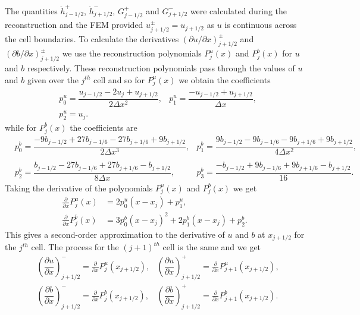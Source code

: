\documentclass[times]{elsarticle}
\begin{document}
The quantities $\ddot{h}^+_{j - 1/2}$, $\ddot{h}^-_{j + 1/2}$, $G^+_{j - 1/2}$ and $G^-_{j + 1/2}$ were calculated during the reconstruction and the FEM provided $u^\pm_{j+1/2} = u_{j+1/2}$ as $u$ is continuous across the cell boundaries. To calculate the derivatives $ \left({\partial {u}}/{\partial x} \right)^\pm_{j + 1/2}$ and $ \left({\partial {b}}/{\partial x} \right)^\pm_{j + 1/2}$ we use the reconstruction polynomials $P^u_j(x)$ and $P^b_j(x)$ for $u$ and $b$ respectively. These reconstruction polynomials pass through the values of $u$ and $b$ given over the $j^{th}$ cell and so
for $P^u_j(x)$ we obtain the coefficients
\begin{align*}
&p^u_0 =  \dfrac{u_{j-1/2} - 2u_j + u_{j+1/2}}{2 \Delta x^2}, 
&p^u_1 =  \dfrac{-u_{j-1/2} + u_{j+1/2}}{\Delta x},\\
&p^u_2 =  u_j.
\end{align*}
while for $P^b_j(x)$ the coefficients are
\begin{align*}
&p^b_0 =  \dfrac{-9b_{j-1/2} + 27b_{j-1/6} - 27 b_{j+1/6} + 9b_{j+1/2}}{2 \Delta x^3}, 
&p^b_1 =  \dfrac{9b_{j-1/2} - 9b_{j-1/6} - 9b_{j+1/6} + 9b_{j+1/2}}{4 \Delta x^2},\\ \\ 
&p^b_2 =  \dfrac{b_{j-1/2} - 27b_{j-1/6} + 27 b_{j+1/6} - b_{j+1/2}}{8 \Delta x},
&p^b_3 =  \dfrac{-b_{j-1/2}  + 9b_{j-1/6} + 9 b_{j+1/6} - b_{j+1/2}}{16}.
\end{align*}
Taking the derivative of the polynomials $P^u_j(x)$ and $P^b_j(x)$ we get
\begin{align*}
\frac{\partial }{\partial x}P^u_j(x) &= 2p^u_0 \left(x - x_j\right) + p^u_1, \\
\frac{\partial }{\partial x}P^b_j(x) &= 3p^b_0 \left(x - x_j\right)^2 + 2p^b_1 \left(x - x_j\right) + p^b_2.
\end{align*}
This gives a second-order approximation to the derivative of $u$ and $b$ at $x_{j+1/2}$ for the $j^{th}$ cell. The process for the $(j+1)^{th}$ cell is the same and we get 
\begin{align}
&\left(\dfrac{\partial {u}}{\partial x} \right)^-_{j + 1/2} = \frac{\partial }{\partial x}P^u_j(x_{j+1/2}), 
&\left(\dfrac{\partial {u}}{\partial x} \right)^+_{j + 1/2} = \frac{\partial }{\partial x}P^u_{j+1}(x_{j+1/2}),  \\
&\left(\dfrac{\partial {b}}{\partial x} \right)^-_{j + 1/2} = \frac{\partial }{\partial x}P^b_j(x_{j+1/2}), 
&\left(\dfrac{\partial {b}}{\partial x} \right)^+_{j + 1/2} = \frac{\partial }{\partial x}P^b_{j+1}(x_{j+1/2}). 
\label{eqn:PolyDeriv}	
\end{align}
\end{document}
